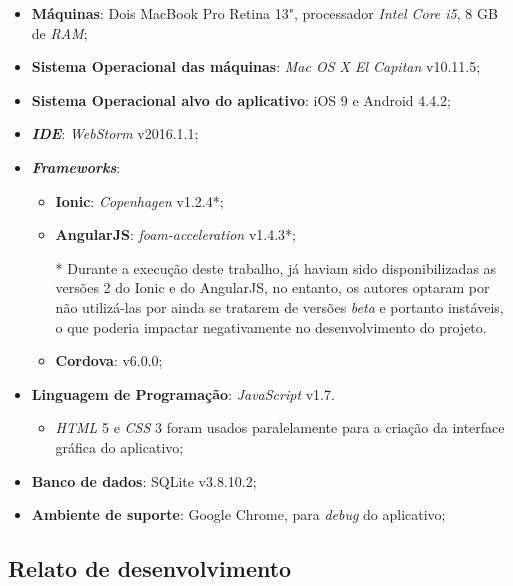 \begin{itemize}
    \item \textbf{Máquinas}: Dois MacBook Pro Retina 13", processador \textit{Intel Core i5}, 8 GB de \textit{RAM};
    \item \textbf{Sistema Operacional das máquinas}: \textit{Mac OS X El Capitan} v10.11.5;
    \item \textbf{Sistema Operacional alvo do aplicativo}: iOS 9 e Android 4.4.2;
    \item \textbf{\textit{IDE}}: \textit{WebStorm} v2016.1.1;
    \item \textbf{\textit{Frameworks}}:
    \begin{itemize}
        \item \textbf{Ionic}: \textit{Copenhagen} v1.2.4*;
        \item \textbf{AngularJS}: \textit{foam-acceleration} v1.4.3*;
        
        * Durante a execução deste trabalho, já haviam sido disponibilizadas as versões 2 do Ionic e do AngularJS, no entanto,
        os autores optaram por não utilizá-las por ainda se tratarem de versões \textit{beta} e portanto instáveis, o que poderia 
        impactar negativamente no desenvolvimento do projeto.
        
        \item \textbf{Cordova}: v6.0.0;
    \end{itemize}
    \item \textbf{Linguagem de Programação}: \textit{JavaScript} v1.7. 
    \begin{itemize}
        \item \textit{HTML} 5 e \textit{CSS} 3 foram usados paralelamente para a criação da interface gráfica do aplicativo;
    \end{itemize}
    \item \textbf{Banco de dados}: SQLite v3.8.10.2;
    \item \textbf{Ambiente de suporte}: Google Chrome, para \textit{debug} do aplicativo;
\end{itemize}

\subsection{Relato de desenvolvimento} \label{subsec:experienciasdev}

